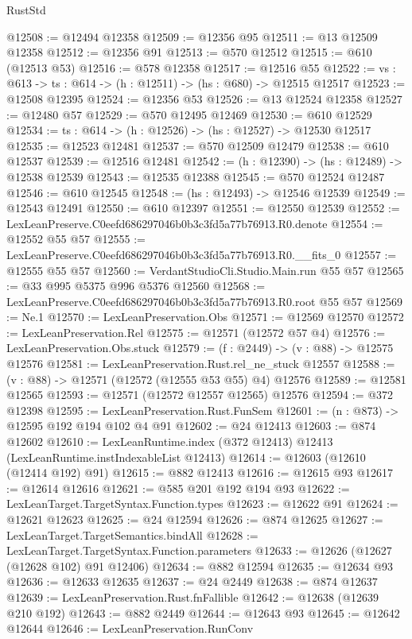 \begin{lexlean}{RustStd}
\begin{coremodule}
@12508 := @12494 @12358
@12509 := @12356 @95
@12511 := @13 @12509 @12358
@12512 := @12356 @91
@12513 := @570 @12512
@12515 := @610 (@12513 @53)
@12516 := @578 @12358
@12517 := @12516 @55
@12522 := {vs : @613} -> {ts : @614} -> (h : @12511) -> (hs : @680) -> @12515 @12517
@12523 := @12508 @12395
@12524 := @12356 @53
@12526 := @13 @12524 @12358
@12527 := @12480 @57
@12529 := @570 @12495 @12469
@12530 := @610 @12529
@12534 := {ts : @614} -> (h : @12526) -> (hs : @12527) -> @12530 @12517
@12535 := @12523 @12481
@12537 := @570 @12509 @12479
@12538 := @610 @12537
@12539 := @12516 @12481
@12542 := (h : @12390) -> (hs : @12489) -> @12538 @12539
@12543 := @12535 @12388
@12545 := @570 @12524 @12487
@12546 := @610 @12545
@12548 := (hs : @12493) -> @12546 @12539
@12549 := @12543 @12491
@12550 := @610 @12397
@12551 := @12550 @12539
@12552 := LexLeanPreserve.C0eefd686297046b0b3c3fd5a77b76913.R0.denote
@12554 := @12552 @55 @57
@12555 := LexLeanPreserve.C0eefd686297046b0b3c3fd5a77b76913.R0.__fits_0
@12557 := @12555 @55 @57
@12560 := VerdantStudioCli.Studio.Main.run @55 @57
@12565 := @33 @995 @5375 @996 @5376 @12560
@12568 := LexLeanPreserve.C0eefd686297046b0b3c3fd5a77b76913.R0.root @55 @57
@12569 := Ne.{1}
@12570 := LexLeanPreservation.Obs
@12571 := @12569 @12570
@12572 := LexLeanPreservation.Rel
@12575 := @12571 (@12572 @57 @4)
@12576 := LexLeanPreservation.Obs.stuck
@12579 := (f : @2449) -> (v : @88) -> @12575 @12576
@12581 := LexLeanPreservation.Rust.rel_ne_stuck @12557
@12588 := (v : @88) -> @12571 (@12572 (@12555 @53 @55) @4) @12576
@12589 := @12581 @12565
@12593 := @12571 (@12572 @12557 @12565) @12576
@12594 := @372 @12398
@12595 := LexLeanPreservation.Rust.FunSem
@12601 := (n : @873) -> @12595 @192 @194 @102 @4 @91
@12602 := @24 @12413
@12603 := @874 @12602
@12610 := LexLeanRuntime.index (@372 @12413) @12413 (LexLeanRuntime.instIndexableList @12413)
@12614 := @12603 (@12610 (@12414 @192) @91)
@12615 := @882 @12413
@12616 := @12615 @93
@12617 := @12614 @12616
@12621 := @585 @201 @192 @194 @93
@12622 := LexLeanTarget.TargetSyntax.Function.types
@12623 := @12622 @91
@12624 := @12621 @12623
@12625 := @24 @12594
@12626 := @874 @12625
@12627 := LexLeanTarget.TargetSemantics.bindAll
@12628 := LexLeanTarget.TargetSyntax.Function.parameters
@12633 := @12626 (@12627 (@12628 @102) @91 @12406)
@12634 := @882 @12594
@12635 := @12634 @93
@12636 := @12633 @12635
@12637 := @24 @2449
@12638 := @874 @12637
@12639 := LexLeanPreservation.Rust.fnFallible
@12642 := @12638 (@12639 @210 @192)
@12643 := @882 @2449
@12644 := @12643 @93
@12645 := @12642 @12644
@12646 := LexLeanPreservation.RunConv

\end{coremodule}
\end{lexlean}

